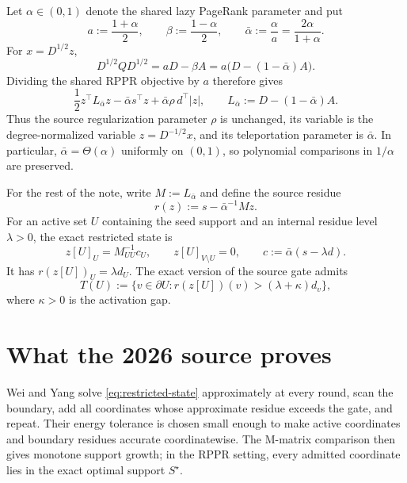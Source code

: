 \documentclass[11pt]{article}
\begin{document}
Let $\alpha\in(0,1)$ denote the shared lazy PageRank parameter and put
\begin{equation}
 a:=\frac{1+\alpha}{2},
 \qquad
 \beta:=\frac{1-\alpha}{2},
 \qquad
 \bar\alpha:=\frac{\alpha}{a}=\frac{2\alpha}{1+\alpha}.
 \label{eq:alpha-map}
\end{equation}
For $x=D^{1/2}z$,
\begin{equation}
 D^{1/2}QD^{1/2}=aD-\beta A
 =a\bigl(D-(1-\bar\alpha)A\bigr).
 \label{eq:matrix-map}
\end{equation}
Dividing the shared RPPR objective by $a$ therefore gives
\begin{equation}
 \frac12 z^\top L_{\bar\alpha}z
 -\bar\alpha s^\top z
 +\bar\alpha\rho\,d^\top |z|,
 \qquad
 L_{\bar\alpha}:=D-(1-\bar\alpha)A.
 \label{eq:source-degree-form}
\end{equation}
Thus the source regularization parameter $\rho$ is unchanged, its variable is
the degree-normalized variable $z=D^{-1/2}x$, and its teleportation parameter
is $\bar\alpha$.  In particular,
$\bar\alpha=\Theta(\alpha)$ uniformly on $(0,1)$, so polynomial comparisons
in $1/\alpha$ are preserved.

For the rest of the note, write $M:=L_{\bar\alpha}$ and define the source
residue
\begin{equation}
 r(z):=s-\bar\alpha^{-1}Mz.
 \label{eq:source-residue}
\end{equation}
For an active set $U$ containing the seed support and an internal residue
level $\lambda>0$, the exact restricted state is
\begin{equation}
 z[U]_U=M_{UU}^{-1}c_U,
 \qquad
 z[U]_{V\setminus U}=0,
 \qquad
 c:=\bar\alpha(s-\lambda d).
 \label{eq:restricted-state}
\end{equation}
It has $r(z[U])_U=\lambda d_U$.  The exact version of the source gate admits
\begin{equation}
 T(U):=\{v\in\partial U:r(z[U])(v)>(\lambda+\kappa)d_v\},
 \label{eq:exact-gate}
\end{equation}
where $\kappa>0$ is the activation gap.

\section{What the 2026 source proves}
\label{sec:source}

Wei and Yang solve \cref{eq:restricted-state} approximately at every round,
scan the boundary, add all coordinates whose approximate residue exceeds the
gate, and repeat.  Their energy tolerance is chosen small enough to make
active coordinates and boundary residues accurate coordinatewise.  The
M-matrix comparison then gives monotone support growth; in the RPPR setting,
every admitted coordinate lies in the exact optimal support $S^\star$.
\end{document}
